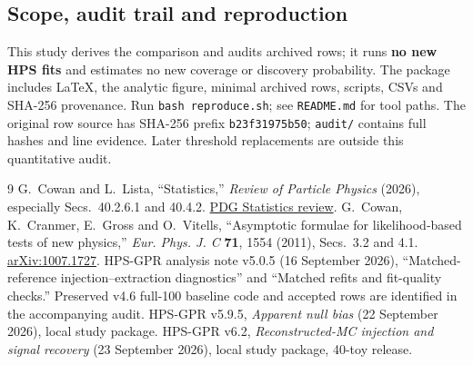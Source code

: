 \documentclass[11pt]{article}
\begin{document}
\subsection*{Scope, audit trail and reproduction}
This study derives the comparison and audits archived rows; it runs
\textbf{no new HPS fits} and estimates no new coverage or discovery
probability. The package includes LaTeX, the analytic figure, minimal
archived rows, scripts, CSVs and SHA-256 provenance. Run
\texttt{bash reproduce.sh}; see \texttt{README.md} for tool paths.
The original row source has SHA-256 prefix \texttt{b23f31975b50};
\texttt{audit/} contains full hashes and line evidence. Later threshold
replacements are outside this quantitative audit.

\begin{thebibliography}{9}\small\setlength{\itemsep}{2pt}\setlength{\parskip}{0pt}
 G.~Cowan and L.~Lista, ``Statistics,'' \emph{Review of Particle
Physics} (2026), especially Secs.~40.2.6.1 and 40.4.2.
\href{https://pdg.lbl.gov/2026/reviews/rpp2026-rev-statistics.pdf}{PDG Statistics review}.
 G.~Cowan, K.~Cranmer, E.~Gross and O.~Vitells,
``Asymptotic formulae for likelihood-based tests of new physics,''
\emph{Eur. Phys. J. C} \textbf{71}, 1554 (2011), Secs.~3.2 and 4.1.
\href{https://arxiv.org/abs/1007.1727}{arXiv:1007.1727}.
 HPS-GPR analysis note v5.0.5 (16 September 2026),
``Matched-reference injection--extraction diagnostics'' and
``Matched refits and fit-quality checks.'' Preserved v4.6 full-100 baseline
code and accepted rows are identified in the accompanying audit.
 HPS-GPR v5.9.5, \emph{Apparent null bias}
(22 September 2026), local study package.
 HPS-GPR v6.2, \emph{Reconstructed-MC injection and signal
recovery} (23 September 2026), local study package, 40-toy release.
\end{thebibliography}
\end{document}
